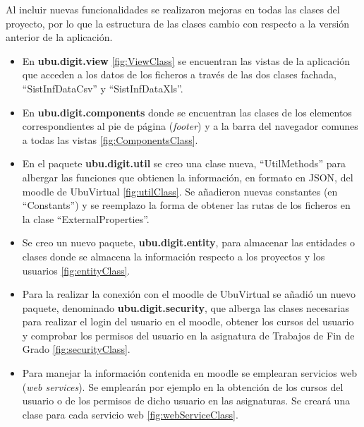 Al incluir nuevas funcionalidades se realizaron mejoras en todas las clases del proyecto, por lo que la estructura de las clases cambio con respecto a la versión anterior de la aplicación.
\begin{itemize}
	\item En \textbf{ubu.digit.view} \ref{fig:ViewClass} se encuentran las vistas de la aplicación que acceden a los datos de los ficheros a través de las dos clases fachada, ``SistInfDataCsv'' y  ``SistInfDataXls''.
	\item En \textbf{ubu.digit.components} donde se encuentran las clases de los elementos correspondientes al pie de página (\emph{footer}) y a la barra del navegador comunes a todas las vistas \ref{fig:ComponentsClass}. 	
	\item En el paquete \textbf{ubu.digit.util} se creo una clase nueva, ``UtilMethods'' para albergar las funciones que obtienen la información, en formato en JSON, del moodle de UbuVirtual \ref{fig:utilClass}. Se añadieron nuevas constantes (en ``Constants'') y se reemplazo la forma de obtener las rutas de los ficheros en la clase ``ExternalProperties''.	
	\item Se creo un nuevo paquete, \textbf{ubu.digit.entity}, para almacenar las entidades o clases donde se almacena la información respecto a los proyectos y los usuarios \ref{fig:entityClass}. 	
	\item Para la realizar la conexión con el moodle de UbuVirtual se añadió un nuevo paquete, denominado \textbf{ubu.digit.security}, que alberga las clases necesarias para realizar el login del usuario en el moodle, obtener los cursos del usuario y comprobar los permisos del usuario en la asignatura de Trabajos de Fin de Grado \ref{fig:securityClass}. 	
	\item Para manejar la información contenida en moodle se emplearan servicios web (\emph{web services}). Se emplearán por ejemplo en la obtención de los cursos del usuario o de los permisos de dicho usuario en las asignaturas. Se creará una clase para cada servicio web  \ref{fig:webServiceClass}.	
\end{itemize}


